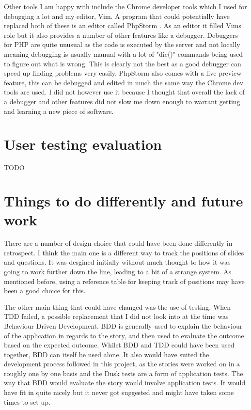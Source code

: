Other tools I am happy with include the Chrome developer tools which I used for debugging a lot and my editor, Vim. A program that could potentially have replaced both of these is an editor called PhpStorm \cite{phpstorm}. As an editor it filled Vims role but it also provides a number of other features like a debugger. Debuggers for PHP are quite unusual as the code is executed by the server and not locally meaning debugging is usually manual with a lot of "die()" commands being used to figure out what is wrong. This is clearly not the best as a good debugger can speed up finding problems very easily. PhpStorm also comes with a live preview feature, this can be debugged and edited in much the same way the Chrome dev tools are used. I did not however use it because I thought that overall the lack of a debugger and other features did not slow me down enough to warrant getting and learning a new piece of software.

\section{User testing evaluation}
TODO

\section{Things to do differently and future work}
There are a number of design choice that could have been done differently in retrospect. I think the main one is a different way to track the positions of slides and questions. It was desgined initially without much thought to how it was going to work further down the line, leading to a bit of a strange system. As mentioned before, using a reference table for keeping track of positions may have been a good choice for this.

The other main thing that could have changed was the use of testing. When TDD failed, a possible replacement that I did not look into at the time was Behaviour Driven Development\cite{bdd}. BDD is generally used to explain the behaviour of the application in regards to the story, and then used to evaluate the outcome based on the expected outcome. Whilst BDD and TDD could have been used together, BDD can itself be used alone. It also would have suited the development process followed in this project, as the stories were worked on in a roughly one by one basis and the Dusk tests are a form of application tests. The way that BDD would evaluate the story would involve application tests. It would have fit in quite nicely but it never got suggested and might have taken some times to set up.

